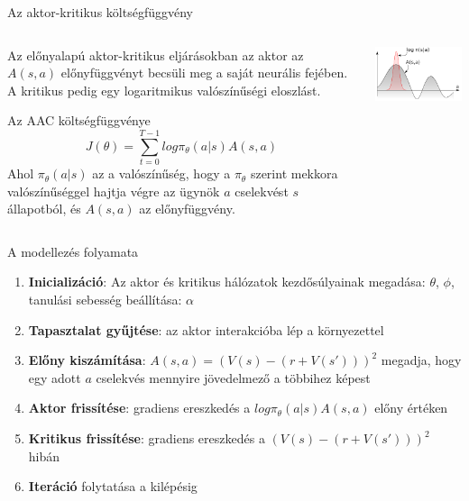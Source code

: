 \documentclass[english, aspectratio=169]{beamer}
\begin{document}
\begin{frame}{Az aktor-kritikus költségfüggvény}
\begin{columns}
\begin{column}{.5\textwidth}
Az előnyalapú aktor-kritikus eljárásokban az aktor az $A(s,a)$ előnyfüggvényt becsüli meg a saját neurális fejében. A kritikus pedig egy logaritmikus valószínűségi eloszlást.
\begin{block}{Az AAC költségfüggvénye}
\[
J(\theta) = \sum_{t=0}^{T-1} log \pi_\theta (a \vert s) A(s,a)
\]
Ahol $\pi_\theta (a \vert s)$ az a valószínűség, hogy a $\pi_\theta$ szerint mekkora valószínűséggel hajtja végre az ügynök $a$ cselekvést $s$ állapotból, és $A(s,a)$ az előnyfüggvény.
\end{block}
\end{column}
\begin{column}{.5\textwidth}
\begin{center}
\includegraphics[width=7cm, keepaspectratio]{images/dql_3.png}
\end{center}
\end{column}
\end{columns}
\end{frame}

\begin{frame}{A modellezés folyamata}
\begin{enumerate}
	\item \textbf{Inicializáció}: Az aktor és kritikus hálózatok kezdősúlyainak megadása: $\theta$, $\phi$, tanulási sebesség beállítása: $\alpha$
	\item \textbf{Tapasztalat gyűjtése}: az aktor interakcióba lép a környezettel
	\item \textbf{Előny kiszámítása}: $A(s,a) = (V(s) - (r + V(s')))^2$ megadja, hogy egy adott $a$ cselekvés mennyire jövedelmező a többihez képest
	\item \textbf{Aktor frissítése}: gradiens ereszkedés a $log \pi_\theta (a \vert s) A(s,a)$ előny értéken
	\item \textbf{Kritikus frissítése}: gradiens ereszkedés a $(V(s) - (r + V(s')))^2$ hibán
	\item \textbf{Iteráció} folytatása a kilépésig
\end{enumerate}
\end{frame}
\end{document}
